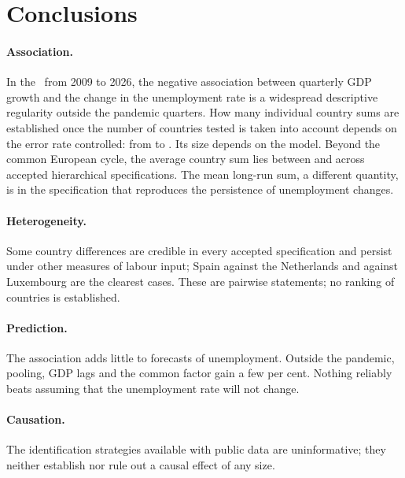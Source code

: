\section{Conclusions}\label{sec:conclusions}

\paragraph{Association.} In the \eu\ from 2009 to 2026, the negative association between
quarterly GDP growth and the change in the unemployment rate is a widespread descriptive
regularity outside the pandemic quarters. How many individual country sums are
established once the number of countries tested is taken into account depends on the
error rate controlled: from  to . Its size depends on
the model. Beyond the common
European cycle, the average country sum lies between  and 
across accepted hierarchical specifications. The mean long-run sum, a different quantity,
is  in the specification that reproduces the persistence of unemployment
changes.

\paragraph{Heterogeneity.} Some country differences are credible in every accepted
specification and persist under other measures of labour input; Spain against the
Netherlands and against Luxembourg are the clearest cases. These are pairwise statements;
no ranking of countries is established.

\paragraph{Prediction.} The association adds little to forecasts of unemployment. Outside
the pandemic, pooling, GDP lags and the common factor gain a few per cent. Nothing
reliably beats assuming that the unemployment rate will not change.

\paragraph{Causation.} The identification strategies available with public data are
uninformative; they neither establish nor rule out a causal effect of any size.

